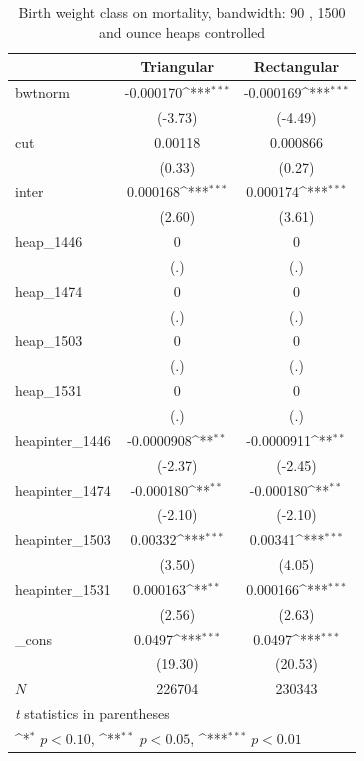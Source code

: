 \documentclass[a4paper,11pt]{article}
\begin{document}
\begin{table}[htbp]\centering
\def\sym#1{\ifmmode^{#1}\else\(^{#1}\)\fi}
\caption{Birth weight class on mortality, bandwidth: 90 , 1500 and ounce heaps controlled}
\label{B4.bw90}
\begin{tabular}{l*{2}{c}}
\hline\hline
            &\multicolumn{1}{c}{Triangular}&\multicolumn{1}{c}{Rectangular}\\
\hline
bwtnorm     &   -0.000170\sym{***}&   -0.000169\sym{***}\\
            &     (-3.73)         &     (-4.49)         \\
[1em]
cut         &     0.00118         &    0.000866         \\
            &      (0.33)         &      (0.27)         \\
[1em]
inter       &    0.000168\sym{***}&    0.000174\sym{***}\\
            &      (2.60)         &      (3.61)         \\
[1em]
heap\_1446   &           0         &           0         \\
            &         (.)         &         (.)         \\
[1em]
heap\_1474   &           0         &           0         \\
            &         (.)         &         (.)         \\
[1em]
heap\_1503   &           0         &           0         \\
            &         (.)         &         (.)         \\
[1em]
heap\_1531   &           0         &           0         \\
            &         (.)         &         (.)         \\
[1em]
heapinter\_1446&  -0.0000908\sym{**} &  -0.0000911\sym{**} \\
            &     (-2.37)         &     (-2.45)         \\
[1em]
heapinter\_1474&   -0.000180\sym{**} &   -0.000180\sym{**} \\
            &     (-2.10)         &     (-2.10)         \\
[1em]
heapinter\_1503&     0.00332\sym{***}&     0.00341\sym{***}\\
            &      (3.50)         &      (4.05)         \\
[1em]
heapinter\_1531&    0.000163\sym{**} &    0.000166\sym{***}\\
            &      (2.56)         &      (2.63)         \\
[1em]
\_cons      &      0.0497\sym{***}&      0.0497\sym{***}\\
            &     (19.30)         &     (20.53)         \\
\hline
\(N\)       &      226704         &      230343         \\
\hline\hline
\multicolumn{3}{l}{\footnotesize \textit{t} statistics in parentheses}\\
\multicolumn{3}{l}{\footnotesize \sym{*} \(p<0.10\), \sym{**} \(p<0.05\), \sym{***} \(p<0.01\)}\\
\end{tabular}
\end{table}
\end{document}
